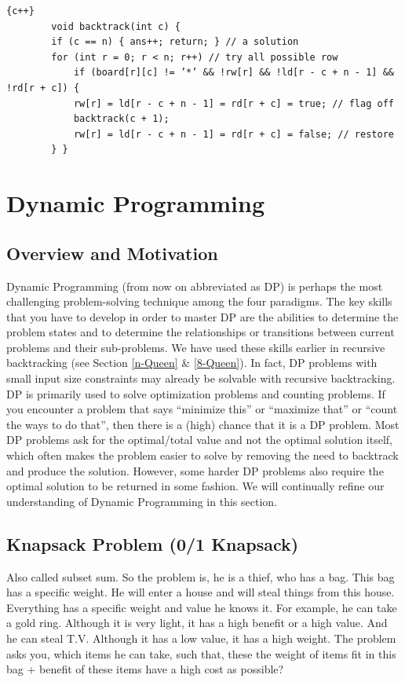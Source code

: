 \begin{lstlisting}{c++}
        void backtrack(int c) {
        if (c == n) { ans++; return; } // a solution
        for (int r = 0; r < n; r++) // try all possible row
            if (board[r][c] != ’*’ && !rw[r] && !ld[r - c + n - 1] && !rd[r + c]) {
            rw[r] = ld[r - c + n - 1] = rd[r + c] = true; // flag off
            backtrack(c + 1);
            rw[r] = ld[r - c + n - 1] = rd[r + c] = false; // restore
        } }
\end{lstlisting}

\newpage

\section{Dynamic Programming}\label{sec:dp}
\subsection{Overview and Motivation}
Dynamic Programming (from now on abbreviated as DP) is perhaps the most challenging problem-solving technique among the four paradigms. The key skills that you have to develop in order to master DP are the abilities to determine the problem states and to determine the relationships or transitions between current problems and their sub-problems. We have used these skills earlier in recursive backtracking (see Section \ref{n-Queen} \& \ref{8-Queen}). In fact, DP problems with small input size constraints may already be solvable with recursive backtracking. DP is primarily used to solve optimization problems and counting problems. If you encounter a problem that says “minimize this” or “maximize that” or “count the ways to do that”, then there is a (high) chance that it is a DP problem. Most DP problems ask for the optimal/total value and not the optimal solution itself, which often makes the problem easier to solve by removing the need to backtrack and produce the solution. However, some harder DP problems also require the optimal solution to be returned in some fashion. We will continually refine our understanding of Dynamic Programming in this section.

\subsection{Knapsack Problem (0/1 Knapsack)}
Also called subset sum. So the problem is, he is a thief, who has a bag. This bag has a specific weight. He will enter a house and will steal things from this house. Everything has a specific weight and value he knows it. For example, he can take a gold ring. Although it is very light, it has a high benefit or a high value. And he can steal T.V. Although it has a low value, it has a high weight. The problem asks you, which items he can take, such that, these the weight of items fit in this bag + benefit of these items have a high cost as possible? 

